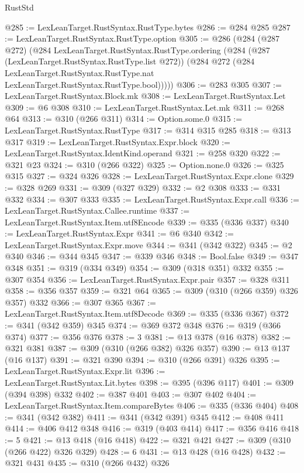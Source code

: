 \begin{lexlean}{RustStd}
\begin{coremodule}
@285 := LexLeanTarget.RustSyntax.RustType.bytes
@286 := @284 @285
@287 := LexLeanTarget.RustSyntax.RustType.option
@305 := @286
    (@284
      (@287 @272)
      (@284
        LexLeanTarget.RustSyntax.RustType.ordering
        (@284
          (@287 (LexLeanTarget.RustSyntax.RustType.list @272))
          (@284
            @272
            (@284 LexLeanTarget.RustSyntax.RustType.nat LexLeanTarget.RustSyntax.RustType.bool)))))
@306 := @283 @305
@307 := LexLeanTarget.RustSyntax.Block.mk
@308 := LexLeanTarget.RustSyntax.Let
@309 := @6 @308
@310 := LexLeanTarget.RustSyntax.Let.mk
@311 := @268 @64
@313 := @310 (@266 @311)
@314 := Option.some.{0}
@315 := LexLeanTarget.RustSyntax.RustType
@317 := @314 @315 @285
@318 := @313 @317
@319 := LexLeanTarget.RustSyntax.Expr.block
@320 := LexLeanTarget.RustSyntax.IdentKind.operand
@321 := @258 @320
@322 := @321 @23
@324 := @310 (@266 @322)
@325 := Option.none.{0}
@326 := @325 @315
@327 := @324 @326
@328 := LexLeanTarget.RustSyntax.Expr.clone
@329 := @328 @269
@331 := @309 (@327 @329)
@332 := @2 @308
@333 := @331 @332
@334 := @307 @333
@335 := LexLeanTarget.RustSyntax.Expr.call
@336 := LexLeanTarget.RustSyntax.Callee.runtime
@337 := LexLeanTarget.RustSyntax.Item.utf8Encode
@339 := @335 (@336 @337)
@340 := LexLeanTarget.RustSyntax.Expr
@341 := @6 @340
@342 := LexLeanTarget.RustSyntax.Expr.move
@344 := @341 (@342 @322)
@345 := @2 @340
@346 := @344 @345
@347 := @339 @346
@348 := Bool.false
@349 := @347 @348
@351 := @319 (@334 @349)
@354 := @309 (@318 @351) @332
@355 := @307 @354
@356 := LexLeanTarget.RustSyntax.Expr.pair
@357 := @328 @311
@358 := @356 @357
@359 := @321 @64
@365 := @309 (@310 (@266 @359) @326 @357) @332
@366 := @307 @365
@367 := LexLeanTarget.RustSyntax.Item.utf8Decode
@369 := @335 (@336 @367)
@372 := @341 (@342 @359) @345
@374 := @369 @372 @348
@376 := @319 (@366 @374)
@377 := @356 @376
@378 := 3
@381 := @13 @378 (@16 @378)
@382 := @321 @381
@387 := @309 (@310 (@266 @382) @326 @357)
@390 := @13 @137 (@16 @137)
@391 := @321 @390
@394 := @310 (@266 @391) @326
@395 := LexLeanTarget.RustSyntax.Expr.lit
@396 := LexLeanTarget.RustSyntax.Lit.bytes
@398 := @395 (@396 @117)
@401 := @309 (@394 @398) @332
@402 := @387 @401
@403 := @307 @402
@404 := LexLeanTarget.RustSyntax.Item.compareBytes
@406 := @335 (@336 @404)
@408 := @341 (@342 @382)
@411 := @341 (@342 @391) @345
@412 := @408 @411
@414 := @406 @412 @348
@416 := @319 (@403 @414)
@417 := @356 @416
@418 := 5
@421 := @13 @418 (@16 @418)
@422 := @321 @421
@427 := @309 (@310 (@266 @422) @326 @329)
@428 := 6
@431 := @13 @428 (@16 @428)
@432 := @321 @431
@435 := @310 (@266 @432) @326

\end{coremodule}
\end{lexlean}
